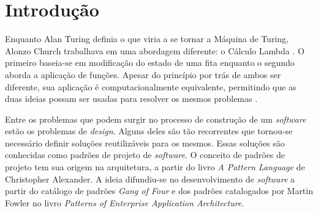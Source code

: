 
\chapter{Introdução}
%

Enquanto Alan Turing definia o que viria a 
se tornar a Máquina de Turing, Alonzo Church 
trabalhava em uma abordagem diferente: o Cálculo Lambda
\cite{church1932set,church1936unsolvable,sep-turing-machine}. 
O primeiro baseia-se em modificação do estado de 
uma fita enquanto o segundo aborda a aplicação 
de funções. Apesar do princípio por trás de ambos 
ser diferente, sua aplicação é computacionalmente 
equivalente, permitindo que as duas ideias possam 
ser usadas para resolver os mesmos problemas
\cite{sep-church-turing}.


Entre os problemas que podem surgir no 
processo de construção de um \textit{software} 
estão os problemas de \textit{design}. Alguns 
deles são tão recorrentes que tornou-se 
necessário definir soluções reutilizáveis 
para os mesmos. Essas soluções são conhecidas 
como padrões de projeto de \textit{software}. 
\cite{gamma:1995} O conceito de padrões de 
projeto tem sua origem na arquitetura, a 
partir do livro \textit{A Pattern Language} 
de Christopher Alexander\cite{alexanderpatternlanguage}. 
A ideia difundiu-se no desenvolvimento 
de \textit{software} a partir do catálogo de 
padrões \textit{Gang of Four} e dos padrões 
catalogados por Martin Fowler no livro 
\textit{Patterns of Enterprise Application Architecture}.
\cite{gamma:1995,fowler2002eea}

